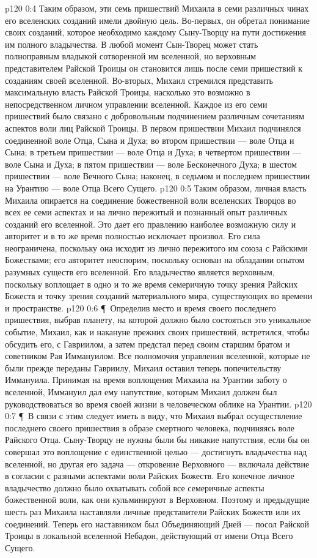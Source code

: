 \vs p120 0:4 Таким образом, эти семь пришествий Михаила в семи различных чинах его вселенских созданий имели двойную цель. Во\hyp{}первых, он обретал понимание своих созданий, которое необходимо каждому Сыну\hyp{}Творцу на пути достижения им полного владычества. В любой момент Сын\hyp{}Творец может стать полноправным владыкой сотворенной им вселенной, но верховным представителем Райской Троицы он становится лишь после семи пришествий к созданиям своей вселенной. Во\hyp{}вторых, Михаил стремился представить максимальную власть Райской Троицы, насколько это возможно в непосредственном личном управлении вселенной. Каждое из его семи пришествий было связано с добровольным подчинением различным сочетаниям аспектов воли лиц Райской Троицы. В первом пришествии Михаил подчинялся соединенной воле Отца, Сына и Духа; во втором пришествии --- воле Отца и Сына; в третьем пришествии --- воле Отца и Духа; в четвертом пришествии --- воле Сына и Духа; в пятом пришествии --- воле Бесконечного Духа; в шестом пришествии --- воле Вечного Сына; наконец, в седьмом и последнем пришествии на Урантию --- воле Отца Всего Сущего.
\vs p120 0:5 Таким образом, личная власть Михаила опирается на соединение божественной воли вселенских Творцов во всех ее семи аспектах и на лично пережитый и познанный опыт различных созданий его вселенной. Это дает его правлению наиболее возможную силу и авторитет и в то же время полностью исключает произвол. Его сила неограничена, поскольку она исходит из лично пережитого им союза с Райскими Божествами; его авторитет неоспорим, поскольку основан на обладании опытом разумных существ его вселенной. Его владычество является верховным, поскольку воплощает в одно и то же время семеричную точку зрения Райских Божеств и точку зрения созданий материального мира, существующих во времени и пространстве.
\vs p120 0:6 \P\ Определив место и время своего последнего пришествия, выбрав планету, на которой должно было состояться это уникальное событие, Михаил, как и накануне прежних своих пришествий, встретился, чтобы обсудить его, с Гавриилом, а затем предстал перед своим старшим братом и советником Рая Иммануилом. Все полномочия управления вселенной, которые не были прежде переданы Гавриилу, Михаил оставил теперь попечительству Иммануила. Принимая на время воплощения Михаила на Урантии заботу о вселенной, Иммануил дал ему напутствие, которым Михаил должен был руководствоваться во время своей жизни в человеческом облике на Урантии.
\vs p120 0:7 \P\ В связи с этим следует иметь в виду, что Михаил выбрал осуществление последнего своего пришествия в образе смертного человека, подчиняясь воле Райского Отца. Сыну\hyp{}Творцу не нужны были бы никакие напутствия, если бы он совершал это воплощение с единственной целью --- достигнуть владычества над вселенной, но другая его задача --- откровение Верховного --- включала действие в согласии с разными аспектами воли Райских Божеств. Его конечное личное владычество должно было охватывать собой все семеричные аспекты божественной воли, как они кульминируют в Верховном. Поэтому и предыдущие шесть раз Михаила наставляли личные представители Райских Божеств или их соединений. Теперь его наставником был Объединяющий Дней --- посол Райской Троицы в локальной вселенной Небадон, действующий от имени Отца Всего Сущего.
